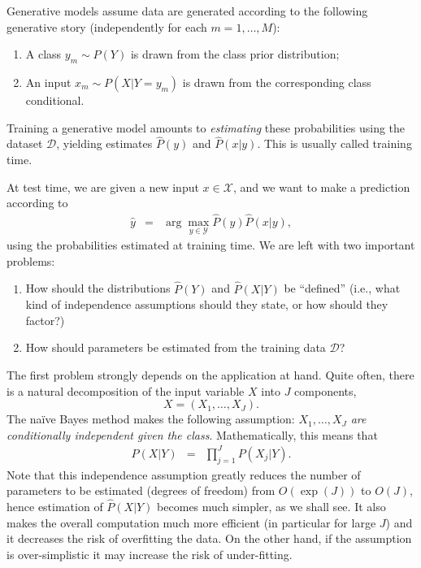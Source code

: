 Generative models assume data are generated according to the following generative story (independently for each $m=1,\ldots,M$): 
\begin{enumerate}
\item A class $y_m \sim P(Y)$ is drawn from the class prior distribution;
\item An input $x_m \sim P(X|Y=y_m)$ is drawn from the corresponding class conditional.
\end{enumerate}
Training a generative model 
amounts to \emph{estimating} these probabilities using the dataset $\mathcal{D}$, yielding estimates 
$\hat{P}(y)$ and $\hat{P}(x|y)$. This is usually called training time.

At test time, we are given a new input $x \in \mathcal{X}$, and we want to make a prediction according to  
\begin{eqnarray}
{\hat y} &=& \arg\max_{y \in \mathcal{Y}} \hat{P}(y) \hat{P}(x|y),
\end{eqnarray}
using the probabilities estimated at training time. We are left with two important problems:
\begin{enumerate}
\item How should the distributions ${\hat P}(Y)$ and ${\hat P}(X|Y)$ be ``defined'' 
(i.e., what kind of independence assumptions should they state, or how should they factor?)
\item How should parameters be estimated from the training data $\mathcal{D}$?
\end{enumerate}
The first problem strongly depends on the application at hand. Quite often, there is a natural decomposition of the input variable $X$ into $J$ components, 
\begin{equation}
X = (X_1,\ldots,X_J). 
\end{equation}
The na\"{i}ve Bayes method makes the following assumption: \emph{$X_1,\ldots,X_J$ are conditionally independent given the class}. Mathematically, this means that 
\begin{eqnarray}
P(X|Y) &=& \prod_{j=1}^J P(X_j|Y).
\end{eqnarray}
Note that this independence assumption greatly reduces the number of parameters to be estimated (degrees of freedom) 
from $O(\exp(J))$ to $O(J)$, 
hence estimation of ${\hat P}(X|Y)$ becomes much simpler, as we shall see. 
It also makes the overall computation much more efficient 
(in particular for large $J$) and it decreases the risk of overfitting the data. 
On the other hand, if the assumption is over-simplistic it may increase the risk 
of under-fitting. 

